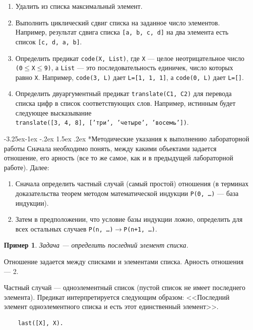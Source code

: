 \documentclass[12pt, openany, twoside]{book} %
\makeatletter
\newtheorem{example}{Пример}[chapter]
\renewcommand\subsubsection{\@startsection{subsubsection}{3}{\z@}%
                                     {-3.25ex\@plus -1ex \@minus -.2ex}%
                                     {1.5ex \@plus .2ex}%
                                     {\normalfont\normalsize\bfseries}}
\makeatother
\begin{document}
\begin{enumerate}
\item Удалить из списка максимальный элемент.
\item Выполнить циклический сдвиг списка на заданное число элементов. Например, результат сдвига списка {\tt [a, b, c, d]} на два элемента есть список {\tt [c, d, a, b]}.
\item Определить предикат {\tt code(Х, List)}, где {\tt Х} --- целое неотрицательное число {\tt (0}$\leq${\tt X}$\leq${\tt 9)}, а {\tt List} --- это последовательность  единичек, число  которых  равно  {\tt Х}.  Например, {\tt code(3, L)} дает {\tt L=[1, 1, 1]}, а {\tt code(0, L)} дает {\tt L=[]}.
\item Определить двуаргументный предикат {\tt translate(С1, С2)} для перевода списка цифр в список соответствующих слов. Например, истинным будет следующее высказывание\\
     {\tt translate([3, 4, 8], ['три', 'четыре', 'восемь'])}.
\end{enumerate}

\subsubsection*{Методические указания к выполнению лабораторной работы}
  Сначала необходимо понять, между какими объектами задается отношение, его арность (все то же самое, как и в предыдущей лабораторной работе). Далее:
  \begin{enumerate}
  \item Сначала определить частный случай (самый простой) отношения (в терминах доказательства теорем методом математической индукции {\tt P(0, \ldots)} --- база индукции).
  \item Затем в предположении, что условие базы индукции ложно, определить для всех остальных случаев {\tt P(n, \ldots)$\to$P(n+1, \ldots)}.
  \end{enumerate}

\begin{example}
  Задача --- определить последний элемент списка.
\end{example}
  Отношение задается между списками и элементами списка. Арность отношения --- 2.

Частный случай --- одноэлементный список (пустой список не имеет последнего элемента). Предикат интерпретируется следующим образом: <<Последний элемент одноэлементного списка и есть этот единственный элемент>>.

{\tt\begin{verbatim}
    last([X], X).
\end{verbatim}}
\end{document}

